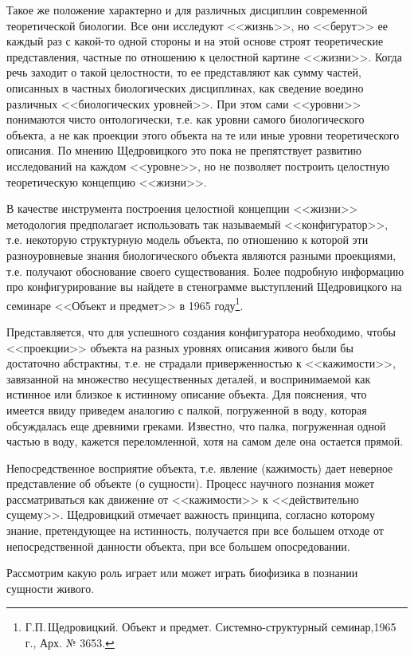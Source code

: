 \documentclass[12pt,a4paper,oneside]{book}
\begin{document}
Такое же положение характерно и для различных дисциплин современной теоретической биологии. Все они исследуют <<жизнь>>, но <<берут>> ее каждый раз с какой-то одной стороны и на этой основе строят теоретические представления, частные по отношению к целостной картине <<жизни>>. Когда речь заходит о такой целостности, то ее представляют как сумму частей, описанных в частных биологических дисциплинах, как сведение воедино различных <<биологических уровней>>. При этом сами <<уровни>> понимаются чисто онтологически, т.е. как уровни самого биологического объекта, а не как проекции этого объекта на те или иные уровни теоретического описания. По мнению Щедровицкого это пока не препятствует развитию исследований на каждом <<уровне>>, но не позволяет построить целостную теоретическую концепцию <<жизни>>.

В качестве инструмента построения целостной концепции <<жизни>> методология предполагает использовать так называемый <<конфигуратор>>, т.е. некоторую структурную модель объекта, по отношению к которой эти разноуровневые знания биологического объекта являются разными проекциями, т.е. получают обоснование своего существования. Более подробную информацию про конфигурирование вы найдете в стенограмме выступлений Щедровицкого на семинаре <<Объект и предмет>> в 1965 году\footnote{Г.П.\,Щедровицкий. Объект и предмет. Системно-структурный семинар,1965 г., Арх. № 3653.}.    

Представляется, что для успешного создания конфигуратора необходимо, чтобы <<проекции>> объекта на разных уровнях описания живого были бы достаточно абстрактны, т.е. не страдали приверженностью к <<кажимости>>, завязанной на множество несущественных деталей, и воспринимаемой как истинное или близкое к истинному описание объекта. Для пояснения, что имеется ввиду приведем аналогию с палкой, погруженной в воду, которая обсуждалась еще древними греками. Известно, что палка, погруженная одной частью в воду, кажется переломленной, хотя на самом деле она остается прямой.

Непосредственное восприятие объекта, т.е. явление (кажимость) дает неверное представление об объекте (о сущности). Процесс научного познания может рассматриваться как движение от <<кажимости>> к <<действительно сущему>>. Щедровицкий отмечает важность принципа, согласно которому знание, претендующее на истинность, получается при все большем отходе от непосредственной данности объекта, при все большем опосредовании.

Рассмотрим какую роль играет или может играть биофизика в познании сущности живого.
\end{document}
